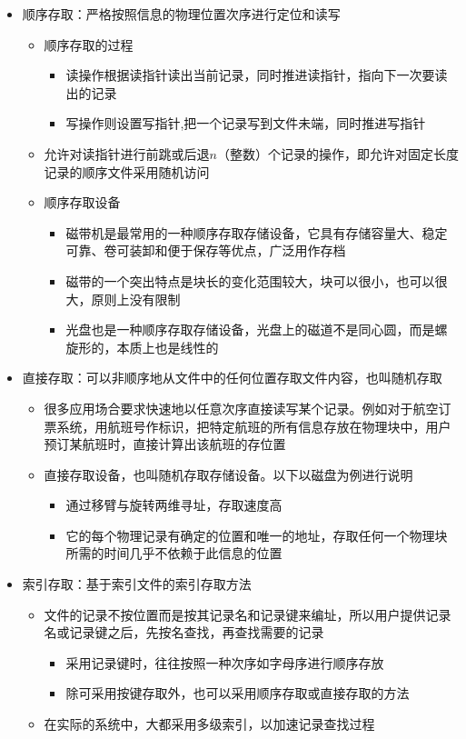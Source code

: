 \documentclass[cs4size,a4paper,10pt]{ctexart}
\begin{document}
	\begin{itemize}
		\item 顺序存取：严格按照信息的物理位置次序进行定位和读写
		\begin{itemize}
			\item 顺序存取的过程
			\begin{itemize}
				\item 读操作根据读指针读出当前记录，同时推进读指针，指向下一次要读出的记录
				\item 写操作则设置写指针,把一个记录写到文件未端，同时推进写指针
			\end{itemize}
			\item 允许对读指针进行前跳或后退$n$（整数）个记录的操作，即允许对固定长度记录的顺序文件采用随机访问
			\item 顺序存取设备
			\begin{itemize}
				\item 磁带机是最常用的一种顺序存取存储设备，它具有存储容量大、稳定可靠、卷可装卸和便于保存等优点，广泛用作存档
				\item 磁带的一个突出特点是块长的变化范围较大，块可以很小，也可以很大，原则上没有限制
				\item 光盘也是一种顺序存取存储设备，光盘上的磁道不是同心圆，而是螺旋形的，本质上也是线性的
			\end{itemize}
		\end{itemize}
		\item 直接存取：可以非顺序地从文件中的任何位置存取文件内容，也叫随机存取
		\begin{itemize}
			\item 很多应用场合要求快速地以任意次序直接读写某个记录。例如对于航空订票系统，用航班号作标识，把特定航班的所有信息存放在物理块中，用户预订某航班时，直接计算出该航班的存位置
			\item 直接存取设备，也叫随机存取存储设备。以下以磁盘为例进行说明
			\begin{itemize}
				\item 通过移臂与旋转两维寻址，存取速度高
				\item 它的每个物理记录有确定的位置和唯一的地址，存取任何一个物理块所需的时间几乎不依赖于此信息的位置
			\end{itemize}
		\end{itemize}
		\item 索引存取：基于索引文件的索引存取方法
		\begin{itemize}
			\item 文件的记录不按位置而是按其记录名和记录键来编址，所以用户提供记录名或记录键之后，先按名查找，再查找需要的记录
			\begin{itemize}
				\item 采用记录键时，往往按照一种次序如字母序进行顺序存放
				\item 除可采用按键存取外，也可以采用顺序存取或直接存取的方法
			\end{itemize}
			\item 在实际的系统中，大都采用多级索引，以加速记录查找过程
		\end{itemize}
	\end{itemize}
\end{document}
